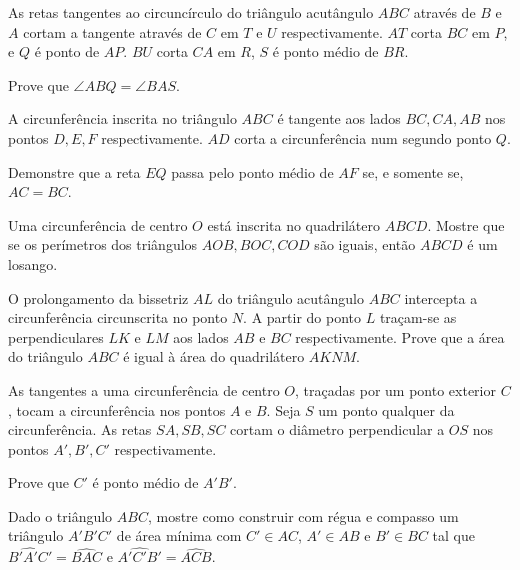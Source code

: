 \begin{questao}
  As retas tangentes ao circuncírculo do triângulo acutângulo $ABC$
  através de $B$ e $A$ cortam a tangente através de $C$ em $T$
  e $U$ respectivamente. $AT$ corta $BC$ em $P$, e $Q$ é
  ponto de $AP$. $BU$ corta $CA$ em $R$, $S$ é ponto médio
  de $BR$.

  Prove que $\angle ABQ = \angle BAS$.
\end{questao}



\begin{questao}
  A circunferência inscrita no triângulo $ABC$ é tangente aos lados
  $BC,CA,AB$ nos pontos $D,E,F$ respectivamente. $AD$ corta a
  circunferência num segundo ponto $Q$.

  Demonstre que a reta $EQ$ passa pelo ponto médio de $AF$ se, e
  somente se, $AC=BC$.
\end{questao}

\begin{questao}
  Uma circunferência de centro $O$ está inscrita no quadrilátero
  $ABCD$. Mostre que se os perímetros dos triângulos $AOB, BOC,
  COD$ são iguais, então $ABCD$ é um losango.
\end{questao}

\begin{questao}
  O prolongamento da bissetriz $AL$ do triângulo acutângulo
  $ABC$ intercepta a circunferência circunscrita no ponto $N$. A
  partir do ponto $L$ traçam-se as perpendiculares $LK$ e $LM$ aos
  lados $AB$ e $BC$ respectivamente. Prove que a área do triângulo
  $ABC$ é igual à área do quadrilátero $AKNM$.

\end{questao}

\begin{questao}
  As tangentes a uma circunferência de centro $O$,
  traçadas por um ponto exterior $C$, tocam a circunferência nos
  pontos $A$ e $B$. Seja $S$ um ponto qualquer da
  circunferência. As retas $SA,SB,SC$ cortam o diâmetro perpendicular
  a $OS$ nos pontos $A',B',C'$
  respectivamente. 

  Prove que $C'$ é ponto médio de $A'B'$.

\end{questao}

\begin{questao}
  Dado o triângulo $ABC$, mostre como construir com régua
  e compasso um triângulo $A' B' C'$ de área mínima
  com $C' \in AC$, $A' \in AB$ e $B' \in BC$ tal
  que $\widehat{B' A' C'} = \widehat{BAC}$ e
  $\widehat{A' C' B'} = \widehat{ACB}$.

\end{questao}


